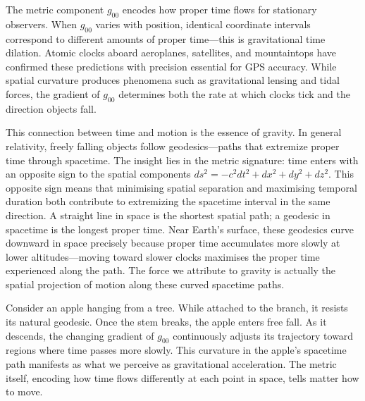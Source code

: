 The metric component \( g_{00} \) encodes how proper time flows for stationary observers. When \( g_{00} \) varies with position, identical coordinate intervals correspond to different amounts of proper time—this is gravitational time dilation. Atomic clocks aboard aeroplanes, satellites, and mountaintops have confirmed these predictions with precision essential for GPS accuracy. While spatial curvature produces phenomena such as gravitational lensing and tidal forces, the gradient of \( g_{00} \) determines both the rate at which clocks tick and the direction objects fall.

This connection between time and motion is the essence of gravity. In general relativity, freely falling objects follow geodesics—paths that extremize proper time through spacetime. The insight lies in the metric signature: time enters with an opposite sign to the spatial components \( ds^2 = -c^2 dt^2 + dx^2 + dy^2 + dz^2 \). This opposite sign means that minimising spatial separation and maximising temporal duration both contribute to extremizing the spacetime interval in the same direction. A straight line in space is the shortest spatial path; a geodesic in spacetime is the longest proper time. Near Earth's surface, these geodesics curve downward in space precisely because proper time accumulates more slowly at lower altitudes—moving toward slower clocks maximises the proper time experienced along the path. The \QSOpen{}force\QSClose{} we attribute to gravity is actually the spatial projection of motion along these curved spacetime paths.

Consider an apple hanging from a tree. While attached to the branch, it resists its natural geodesic. Once the stem breaks, the apple enters free fall. As it descends, the changing gradient of \( g_{00} \) continuously adjusts its trajectory toward regions where time passes more slowly. This curvature in the apple's spacetime path manifests as what we perceive as gravitational acceleration. The metric itself, encoding how time flows differently at each point in space, tells matter how to move.


\newpage

